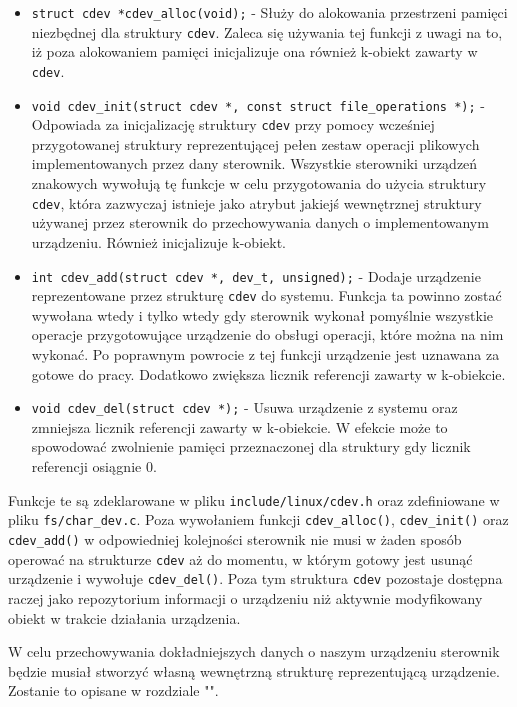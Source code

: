 \documentclass[10pt]{scrartcl}
\begin{document}
\begin{itemize}
\item
  \texttt{struct cdev *cdev\_alloc(void);} - Służy do alokowania przestrzeni pamięci niezbędnej dla struktury \texttt{cdev}. Zaleca się używania tej funkcji z uwagi na to, iż poza alokowaniem pamięci inicjalizuje ona również k-obiekt zawarty w \texttt{cdev}.
\item
  \texttt{void cdev\_init(struct cdev *, const struct file\_operations *);} - \newline Odpowiada za inicjalizację struktury \texttt{cdev} przy pomocy wcześniej przygotowanej struktury reprezentującej pełen zestaw operacji plikowych implementowanych przez dany sterownik. Wszystkie sterowniki urządzeń znakowych wywołują tę funkcje w celu przygotowania do użycia struktury \texttt{cdev}, która zazwyczaj istnieje jako atrybut jakiejś wewnętrznej struktury używanej przez sterownik do przechowywania danych o implementowanym urządzeniu. Również inicjalizuje k-obiekt.
\item
  \texttt{int cdev\_add(struct cdev *, dev\_t, unsigned);} - Dodaje urządzenie reprezentowane przez strukturę \texttt{cdev} do systemu.  Funkcja ta powinno zostać wywołana wtedy i tylko wtedy gdy sterownik wykonał pomyślnie wszystkie operacje przygotowujące urządzenie do obsługi operacji, które można na nim wykonać. Po poprawnym powrocie z tej funkcji urządzenie jest uznawana za gotowe do pracy. Dodatkowo zwiększa licznik referencji zawarty w k-obiekcie.
\item
  \texttt{void cdev\_del(struct cdev *);} - Usuwa urządzenie z systemu oraz zmniejsza licznik referencji zawarty w k-obiekcie. W efekcie może to spowodować zwolnienie pamięci przeznaczonej dla struktury gdy licznik referencji osiągnie 0.
\end{itemize}

Funkcje te są zdeklarowane w pliku \texttt{include/linux/cdev.h} oraz zdefiniowane w pliku \texttt{fs/char\_dev.c}. Poza wywołaniem funkcji \texttt{cdev\_alloc()}, \texttt{cdev\_init()} oraz \texttt{cdev\_add()} w odpowiedniej kolejności sterownik nie musi w żaden sposób operować na strukturze \texttt{cdev} aż do momentu, w którym gotowy jest usunąć urządzenie i wywołuje \texttt{cdev\_del()}. Poza tym struktura \texttt{cdev} pozostaje dostępna raczej jako repozytorium informacji o urządzeniu niż aktywnie modyfikowany obiekt w trakcie działania urządzenia.

W celu przechowywania dokładniejszych danych o naszym urządzeniu sterownik będzie musiał stworzyć własną wewnętrzną strukturę reprezentującą urządzenie. Zostanie to opisane w rozdziale "".
\end{document}
